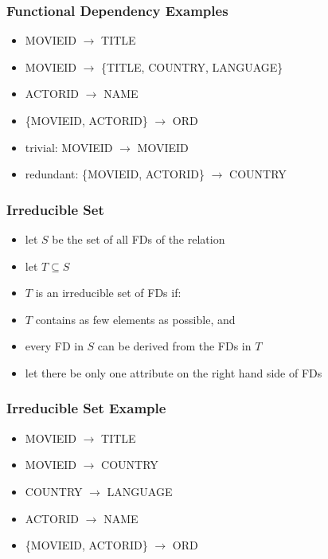 \documentclass[dvipsnames]{beamer}
\begin{document}
\begin{frame}
  \frametitle{Functional Dependency Examples}

  \begin{itemize}
    \item MOVIEID $\rightarrow$ TITLE
    \item MOVIEID $\rightarrow$ \{TITLE, COUNTRY, LANGUAGE\}
    \item ACTORID $\rightarrow$ NAME
    \item \{MOVIEID, ACTORID\} $\rightarrow$ ORD

    \pause
    \medskip
    \item trivial: MOVIEID $\rightarrow$ MOVIEID
    \item redundant: \{MOVIEID, ACTORID\} $\rightarrow$ COUNTRY
  \end{itemize}
\end{frame}

\begin{frame}
  \frametitle{Irreducible Set}

  \begin{itemize}
    \item let $S$ be the set of all FDs of the relation
    \item let $T \subseteq S$

    \medskip
    \item $T$ is an irreducible set of FDs if:

    \smallskip
    \item $T$ contains as few elements as possible, and
    \item every FD in $S$ can be derived from the FDs in $T$

    \pause
    \medskip
    \item let there be only one attribute on the right hand side of FDs
  \end{itemize}
\end{frame}

\begin{frame}
  \frametitle{Irreducible Set Example}

  \begin{itemize}
    \item MOVIEID $\rightarrow$ TITLE
    \item MOVIEID $\rightarrow$ COUNTRY
    \item COUNTRY $\rightarrow$ LANGUAGE
    \item ACTORID $\rightarrow$ NAME
    \item \{MOVIEID, ACTORID\} $\rightarrow$ ORD
  \end{itemize}
\end{frame}
\end{document}
